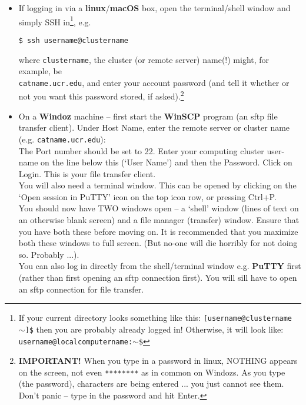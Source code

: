\documentclass[11pt,fleqn]{book} %
\begin{document}
\begin{itemize}
\vspace{1mm}
\item If logging in via a \textbf{linux}/\textbf{macOS} box, open the terminal/shell window and simply SSH in\footnote{If your current directory looks something like this: \texttt{[username@clustername \(\sim\)]\$}
then you are probably already logged in! Otherwise, it will look like: \texttt{username@localcomputername:\(\sim\)\$}}, e.g.

\vspace{-1mm}
\begin{verbatim}
$ ssh username@clustername
\end{verbatim}
\vspace{-1mm}

where \texttt{clustername}, the cluster (or remote server) name(!) might, for example, be
\\  \texttt{catname.ucr.edu}, and enter your  account password (and tell it whether or not you want this password stored, if asked).\footnote{\textbf{IMPORTANT!}
 When you type in a password in linux, NOTHING appears on the screen, not even \texttt{********} as in common on Windozs. As you type (the password), characters are being entered ... you just cannot see them. Don't panic -- type in the password and hit \textsf{\scriptsize Enter}.}

\vspace{1mm}
\item On a \textbf{Windoz} machine – first start the \textbf{WinSCP} program (an sftp file transfer client). Under \textsf{\footnotesize Host Name}, enter the remote server or cluster name (e.g. \texttt{catname.ucr.edu}):
\\The \textsf{\footnotesize Port number} should be set to \textsf{\footnotesize 22}. Enter your computing cluster user-name on the line below this (‘User Name’) and then the Password. Click on Login. This is your file transfer client.
\\You will also need a terminal window. This can be opened by clicking on the ‘\textsf{\footnotesize Open session in PuTTY}’ icon on the top icon row, or pressing \textsf{\footnotesize Ctrl+P}. \\You should now have TWO windows open – a ‘shell’ window (lines of text on an otherwise blank screen) and a file manager (transfer) window. Ensure that you have both these before moving on. It is recommended that you maximize both these windows to full screen. (But no-one will die horribly for not doing so. Probably ...).
\\ You can also log in directly from the shell/terminal window e.g. \textbf{PuTTY} first (rather than first opening an sftp connection first).
 You will sill have to open an sftp connection for file transfer.
\end{itemize}
\end{document}
